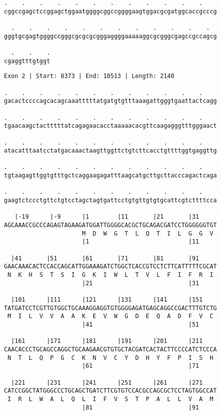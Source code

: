 \documentclass{article}
\begin{document}
\newpage
\begin{Verbatim}[fontfamily=courier]
  .    .    .    .    .    .    .    .    .    .    .    .  
cggccgagctccggagctggaatggggcggccggggaagtggacgcgatggcaccgcccg

  .    .    .    .    .    .    .    .    .    .    .    .  
gggtgcgagtggggccgggcgcgcgcgggaggggaaaaaggcgcgggcgagccgccagcg

  .    .    .
cgaggtttgtggt
\end{Verbatim}
\newpage
\begin{Verbatim}[fontfamily=courier]
Exon 2 | Start: 8373 | End: 10513 | Length: 2140

.    .    .    .    .    .    .    .    .    .    .    .    
gacactccccagcacagcaaatttttatgatgtgtttaaagattgggtgaattactcagg

.    .    .    .    .    .    .    .    .    .    .    .    
tgaacaagctactttttatcagagaacacctaaaaacacgttcaagagggtttgggaact

.    .    .    .    .    .    .    .    .    .    .    .    
atacatttaatcctatgacaaactaagttggttctgtcttcacctgttttggtgaggttg

.    .    .    .    .    .    .    .    .    .    .    .    
tgtaagagttggtgtttgctcaggaagagatttaagcatgcttgcttacccagactcaga

.    .    .    .    .    .    .    .    .    .    .    .    
gaagtctccctgttctgtcctagctagtgattcctgtgttgtgtgcattcgtcttttcca

   |-19      |-9      |1        |11       |21       |31     
AGCAAACCGCCCAGAGTAGAAGATGGATTGGGGCACGCTGCAGACGATCCTGGGGGGTGT
                      M  D  W  G  T  L  Q  T  I  L  G  G  V 
                      |1                            |11     

  |41       |51       |61       |71       |81       |91     
GAACAAACACTCCACCAGCATTGGAAAGATCTGGCTCACCGTCCTCTTCATTTTTCGCAT
 N  K  H  S  T  S  I  G  K  I  W  L  T  V  L  F  I  F  R  I 
                      |21                           |31     

  |101      |111      |121      |131      |141      |151    
TATGATCCTCGTTGTGGCTGCAAAGGAGGTGTGGGGAGATGAGCAGGCCGACTTTGTCTG
 M  I  L  V  V  A  A  K  E  V  W  G  D  E  Q  A  D  F  V  C 
                      |41                           |51     

  |161      |171      |181      |191      |201      |211    
CAACACCCTGCAGCCAGGCTGCAAGAACGTGTGCTACGATCACTACTTCCCCATCTCCCA
 N  T  L  Q  P  G  C  K  N  V  C  Y  D  H  Y  F  P  I  S  H 
                      |61                           |71     

  |221      |231      |241      |251      |261      |271    
CATCCGGCTATGGGCCCTGCAGCTGATCTTCGTGTCCACGCCAGCGCTCCTAGTGGCCAT
 I  R  L  W  A  L  Q  L  I  F  V  S  T  P  A  L  L  V  A  M 
                      |81                           |91     

\end{Verbatim}
\end{document}
